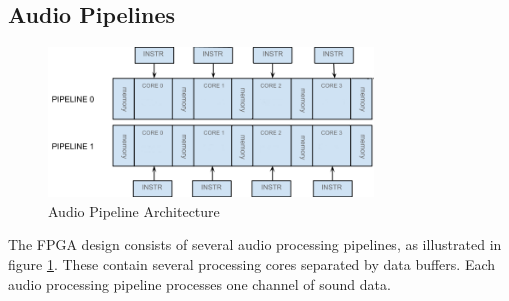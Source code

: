 \FloatBarrier
\subsection{Audio Pipelines}\label{subsec:audio_pipelines}

\begin{figure}[H]
    \centering
    \includegraphics[height=150px]{figures/fpga/system_components_general_pipeline_without_programs.png}
    \caption{Audio Pipeline Architecture}
    \label{fig:pipeline_architecture}
\end{figure}

The FPGA design consists of several audio processing pipelines, as illustrated in
figure \ref{fig:pipeline_architecture}. These contain several processing cores
separated by data buffers. Each audio processing pipeline processes one channel
of sound data.

